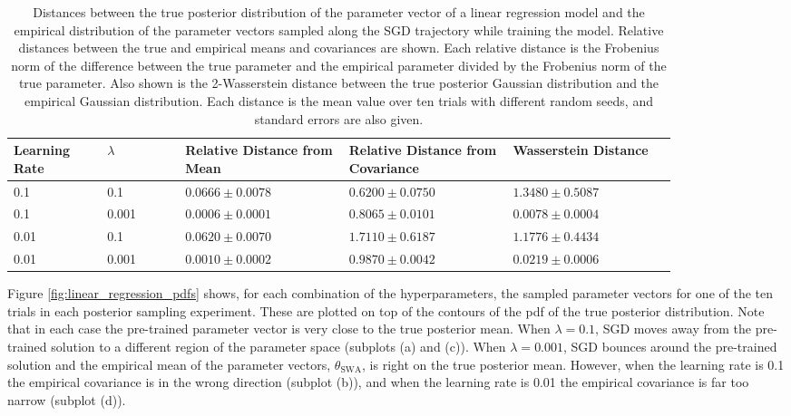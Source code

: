 \documentclass[msc,deptreport.inf]{infthesis} %
\begin{document}
\begin{table}[h!]
	\begin{center}
		\begin{tabular}{|| p{0.12\linewidth} p{0.1\linewidth} p{0.21\linewidth} p{0.21\linewidth} p{0.21\linewidth} ||} 
 			\hline
 			Learning Rate & $\lambda$ & Relative Distance from Mean & Relative Distance from Covariance & Wasserstein Distance \\ [0.5ex] 
 			\hline\hline
 			0.1 &  0.1 & $0.0666 \pm 0.0078$ & $0.6200 \pm 0.0750$ & $1.3480 \pm 0.5087$ \\ 
			\hline
 			0.1 & 0.001 & $0.0006 \pm 0.0001$ & $0.8065 \pm 0.0101$ & $0.0078 \pm 0.0004$  \\
			\hline
			0.01 & 0.1 & $0.0620 \pm 0.0070$ & $1.7110 \pm 0.6187$ & $1.1776 \pm 0.4434$ \\ 
			\hline
 			0.01 & 0.001 & $0.0010 \pm 0.0002$ & $0.9870 \pm 0.0042$ & $0.0219 \pm 0.0006$  \\ [1ex] 
			\hline
		\end{tabular}
		\caption{Distances between the true posterior distribution of the parameter vector of a linear regression model and the empirical distribution of the parameter vectors sampled along the SGD trajectory while training the model. Relative distances between the true and empirical means and covariances are shown. Each relative distance is the Frobenius norm of the difference between the true parameter and the empirical parameter divided by the Frobenius norm of the true parameter. Also shown is the 2-Wasserstein distance between the true posterior Gaussian distribution and the empirical Gaussian distribution. Each distance is the mean value over ten trials with different random seeds, and standard errors are also given.}
		\label{table:linear_regression_samples}
	\end{center}
\end{table}

Figure \ref{fig:linear_regression_pdfs} shows, for each combination of the hyperparameters, the sampled parameter vectors for one of the ten trials in each posterior sampling experiment. These are plotted on top of the contours of the pdf of the true posterior distribution. Note that in each case the pre-trained parameter vector is very close to the true posterior mean. When $\lambda = 0.1$, SGD moves away from the pre-trained solution to a different region of the parameter space (subplots (a) and (c)). When $\lambda = 0.001$, SGD bounces around the pre-trained solution and the empirical mean of the parameter vectors, $\theta_{\text{SWA}}$, is right on the true posterior mean. However, when the learning rate is 0.1 the empirical covariance is in the wrong direction (subplot (b)), and when the learning rate is 0.01 the empirical covariance is far too narrow (subplot (d)).
\end{document}
